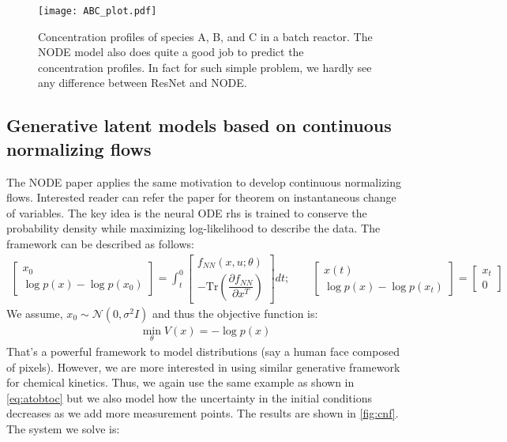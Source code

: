 \documentclass[fontsize=11pt]{article}
\theoremstyle{definition}
\begin{document}
\begin{figure}[h]
    \centering
    \texttt{[image: ABC\_plot.pdf]} 
    \caption{Concentration profiles of species A, B, and C in a batch reactor. The
    NODE model also does quite a good job to predict the concentration profiles. 
    In fact for such simple problem, we hardly see any difference between ResNet and NODE.}
    \label{fig:node}
\end{figure}

\subsection{Generative latent models based on continuous normalizing flows}

The NODE paper applies the same motivation to develop continuous normalizing flows.
Interested reader can refer the paper for theorem on instantaneous change of variables.
The key idea is the neural ODE rhs is trained to conserve the probability density 
while maximizing log-likelihood to describe the data. The framework can be described 
as follows:
\begin{align}
    \begin{bmatrix}
        x_0 \\
        \log p(x) - \log p(x_0)
    \end{bmatrix}
    =
    \int_{t}^{0}
    \begin{bmatrix}
        f_{NN}(x, u; \theta) \\
        -\mathrm{Tr} \left(\dfrac{\partial f_{NN}}{\partial x^T}\right)
    \end{bmatrix} dt;
    \qquad
    \begin{bmatrix}
        x(t) \\
        \log p(x) - \log p(x_t)
    \end{bmatrix}   
    =
    \begin{bmatrix}
        x_t \\
        0
    \end{bmatrix}
\end{align}
We assume, $x_0 \sim \mathcal{N}(0, \sigma^2I)$ and thus the objective function is:
\begin{align}
    \min\limits_{\theta} V(x) = -\log p(x)
\end{align}
That's a powerful framework to model distributions (say a human face composed of pixels).
However, we are more interested in using similar generative framework for chemical kinetics. 
Thus, we again use the same example as shown in \cref{eq:atobtoc} but we also model 
how the uncertainty in the initial conditions decreases as we add more measurement points.
The results are shown in \cref{fig:cnf}. The system we solve is:
\end{document}

